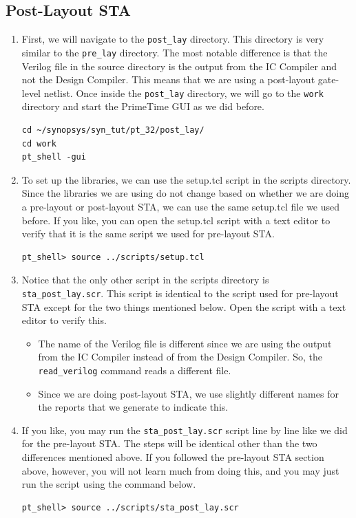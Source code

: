 \documentclass[a4paper,12pt,twoside]{article}
\begin{document}
\subsection{Post-Layout STA}\label{SPostSTA}
\begin{enumerate}
    \item First, we will navigate to the \texttt{post\_lay} directory. This directory is very similar to the \texttt{pre\_lay} directory. The most notable difference is that the Verilog file in the source directory is the output from the IC Compiler and not the Design Compiler. This means that we are using a post-layout gate-level netlist. Once inside the \texttt{post\_lay} directory, we will go to the \texttt{work} directory and start the PrimeTime GUI as we did before.
    \begin{verbatim}
cd ~/synopsys/syn_tut/pt_32/post_lay/
cd work
pt_shell -gui
    \end{verbatim}
    \item To set up the libraries, we can use the setup.tcl script in the scripts directory. Since the libraries we are using do not change based on whether we are doing a pre-layout or post-layout STA, we can use the same setup.tcl file we used before. If you like, you can open the setup.tcl script with a text editor to verify that it is the same script we used for pre-layout STA.
    \begin{verbatim}
pt_shell> source ../scripts/setup.tcl
    \end{verbatim}
    \item Notice that the only other script in the scripts directory is \texttt{sta\_post\_lay.scr}. This script is identical to the script used for pre-layout STA except for the two things mentioned below. Open the script with a text editor to verify this.
    \begin{itemize}
        \item The name of the Verilog file is different since we are using the output from the IC Compiler instead of from the Design Compiler. So, the \texttt{read\_verilog} command reads a different file.
        \item Since we are doing post-layout STA, we use slightly different names for the reports that we generate to indicate this.
    \end{itemize}
    \item If you like, you may run the \texttt{sta\_post\_lay.scr} script line by line like we did for the pre-layout STA. The steps will be identical other than the two differences mentioned above. If you followed the pre-layout STA section above, however, you will not learn much from doing this, and you may just run the script using the command below.
    \begin{verbatim}
pt_shell> source ../scripts/sta_post_lay.scr
    \end{verbatim}
\end{enumerate}
\end{document}
